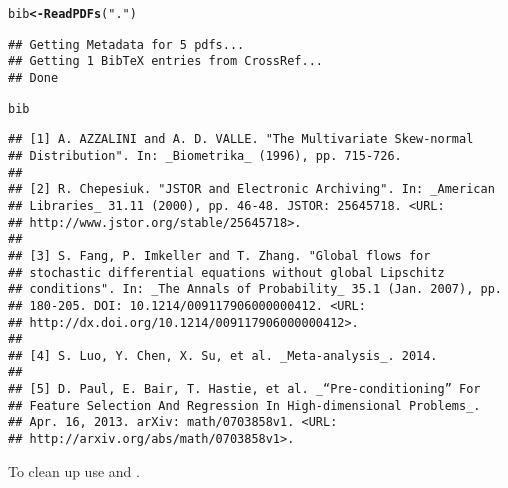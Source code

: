 \documentclass[article]{jss}\usepackage[]{graphicx}\usepackage[]{color}
\makeatletter
\newcommand{\hlstr}[1]{\textcolor[rgb]{0.125,0.125,1}{#1}}%
\newcommand{\hlstd}[1]{\textcolor[rgb]{0.251,0.251,0.282}{#1}}%
\newcommand{\hlkwb}[1]{\textcolor[rgb]{0.439,0.251,1}{\textbf{#1}}}%
\newcommand{\hlkwd}[1]{\textcolor[rgb]{0.251,0.251,0.282}{\textbf{#1}}}%
\newenvironment{kframe}{%
 \def\at@end@of@kframe{}%
 \ifinner\ifhmode%
  \def\at@end@of@kframe{\end{minipage}}%
  \begin{minipage}{\columnwidth}%
 \fi\fi%
 \def\FrameCommand##1{\hskip\@totalleftmargin \hskip-\fboxsep
 \colorbox{shadecolor}{##1}\hskip-\fboxsep
     \hskip-\linewidth \hskip-\@totalleftmargin \hskip\columnwidth}%
 \MakeFramed {\advance\hsize-\width
   \@totalleftmargin\z@ \linewidth\hsize
   \@setminipage}}%
 {\par\unskip\endMakeFramed%
 \at@end@of@kframe}
\newenvironment{knitrout}{}{} %
\makeatother
\begin{document}
\begin{knitrout}
\color{fgcolor}\begin{kframe}
\begin{alltt}
\hlstd{bib} \hlkwb{<-} \hlkwd{ReadPDFs}\hlstd{(}\hlstr{"."}\hlstd{)}
\end{alltt}
\begin{lstlisting}
## Getting Metadata for 5 pdfs...
## Getting 1 BibTeX entries from CrossRef...
## Done
\end{lstlisting}\begin{alltt}
\hlstd{bib}
\end{alltt}
\begin{verbatim}
## [1] A. AZZALINI and A. D. VALLE. "The Multivariate Skew-normal
## Distribution". In: _Biometrika_ (1996), pp. 715-726.
## 
## [2] R. Chepesiuk. "JSTOR and Electronic Archiving". In: _American
## Libraries_ 31.11 (2000), pp. 46-48. JSTOR: 25645718. <URL:
## http://www.jstor.org/stable/25645718>.
## 
## [3] S. Fang, P. Imkeller and T. Zhang. "Global flows for
## stochastic differential equations without global Lipschitz
## conditions". In: _The Annals of Probability_ 35.1 (Jan. 2007), pp.
## 180-205. DOI: 10.1214/009117906000000412. <URL:
## http://dx.doi.org/10.1214/009117906000000412>.
## 
## [4] S. Luo, Y. Chen, X. Su, et al. _Meta-analysis_. 2014.
## 
## [5] D. Paul, E. Bair, T. Hastie, et al. _“Pre-conditioning” For
## Feature Selection And Regression In High-dimensional Problems_.
## Apr. 16, 2013. arXiv: math/0703858v1. <URL:
## http://arxiv.org/abs/math/0703858v1>.
\end{verbatim}
\end{kframe}
\end{knitrout}

To clean up use  and .
\end{document}
